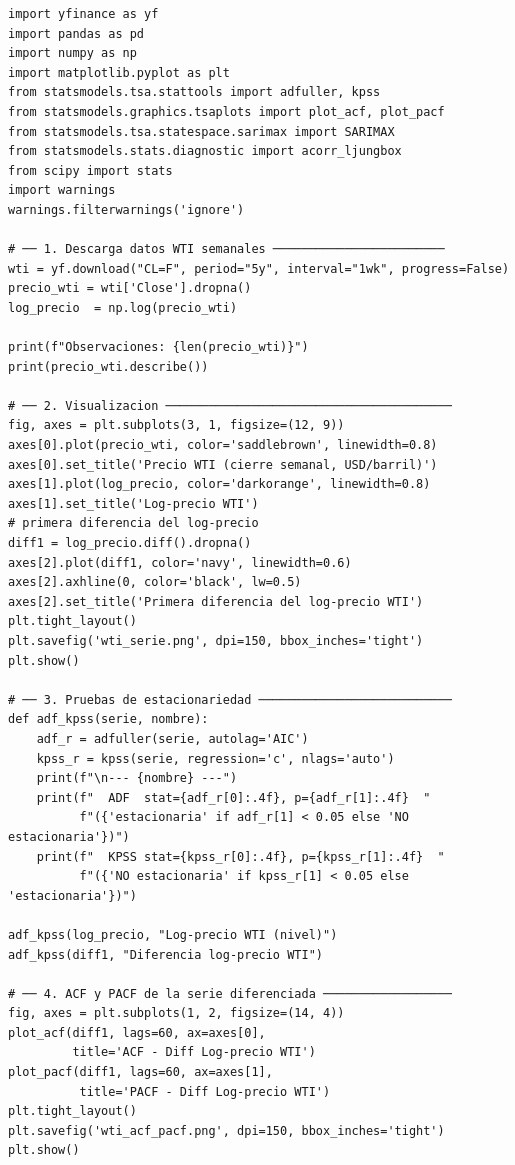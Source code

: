 \documentclass[12pt,a4paper]{article}
\begin{document}
\begin{lstlisting}[caption={Ejemplo 3: SARIMA para petróleo WTI semanal},label=lst:wti]
import yfinance as yf
import pandas as pd
import numpy as np
import matplotlib.pyplot as plt
from statsmodels.tsa.stattools import adfuller, kpss
from statsmodels.graphics.tsaplots import plot_acf, plot_pacf
from statsmodels.tsa.statespace.sarimax import SARIMAX
from statsmodels.stats.diagnostic import acorr_ljungbox
from scipy import stats
import warnings
warnings.filterwarnings('ignore')

# ── 1. Descarga datos WTI semanales ────────────────────────
wti = yf.download("CL=F", period="5y", interval="1wk", progress=False)
precio_wti = wti['Close'].dropna()
log_precio  = np.log(precio_wti)

print(f"Observaciones: {len(precio_wti)}")
print(precio_wti.describe())

# ── 2. Visualizacion ────────────────────────────────────────
fig, axes = plt.subplots(3, 1, figsize=(12, 9))
axes[0].plot(precio_wti, color='saddlebrown', linewidth=0.8)
axes[0].set_title('Precio WTI (cierre semanal, USD/barril)')
axes[1].plot(log_precio, color='darkorange', linewidth=0.8)
axes[1].set_title('Log-precio WTI')
# primera diferencia del log-precio
diff1 = log_precio.diff().dropna()
axes[2].plot(diff1, color='navy', linewidth=0.6)
axes[2].axhline(0, color='black', lw=0.5)
axes[2].set_title('Primera diferencia del log-precio WTI')
plt.tight_layout()
plt.savefig('wti_serie.png', dpi=150, bbox_inches='tight')
plt.show()

# ── 3. Pruebas de estacionariedad ───────────────────────────
def adf_kpss(serie, nombre):
    adf_r = adfuller(serie, autolag='AIC')
    kpss_r = kpss(serie, regression='c', nlags='auto')
    print(f"\n--- {nombre} ---")
    print(f"  ADF  stat={adf_r[0]:.4f}, p={adf_r[1]:.4f}  "
          f"({'estacionaria' if adf_r[1] < 0.05 else 'NO estacionaria'})")
    print(f"  KPSS stat={kpss_r[0]:.4f}, p={kpss_r[1]:.4f}  "
          f"({'NO estacionaria' if kpss_r[1] < 0.05 else 'estacionaria'})")

adf_kpss(log_precio, "Log-precio WTI (nivel)")
adf_kpss(diff1, "Diferencia log-precio WTI")

# ── 4. ACF y PACF de la serie diferenciada ──────────────────
fig, axes = plt.subplots(1, 2, figsize=(14, 4))
plot_acf(diff1, lags=60, ax=axes[0],
         title='ACF - Diff Log-precio WTI')
plot_pacf(diff1, lags=60, ax=axes[1],
          title='PACF - Diff Log-precio WTI')
plt.tight_layout()
plt.savefig('wti_acf_pacf.png', dpi=150, bbox_inches='tight')
plt.show()


\end{lstlisting}
\end{document}
